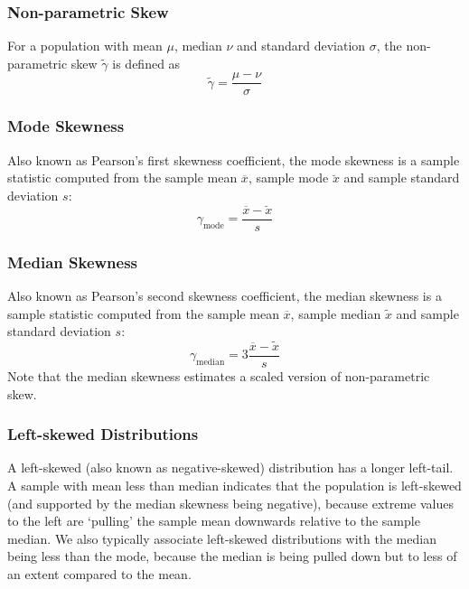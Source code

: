 \documentclass[11pt]{report} %
\begin{document}
\subsubsection{Non-parametric Skew}

For a population with mean $\mu$, median $\nu$ and standard deviation $\sigma$, the non-parametric skew $\widetilde{\gamma}$ is defined as
\begin{equation}
\widetilde{\gamma} = \dfrac{\mu - \nu}{\sigma}
\end{equation}

\subsubsection{Mode Skewness}

Also known as Pearson's first skewness coefficient, the mode skewness is a sample statistic computed from the sample mean $\overline{x}$, sample mode $\breve{x}$ and sample standard deviation $s$:
\begin{equation}
\gamma_{\mathrm{mode}} = \dfrac{\overline{x} - \breve{x}}{s}
\end{equation}

\subsubsection{Median Skewness}

Also known as Pearson's second skewness coefficient, the median skewness is a sample statistic computed from the sample mean $\overline{x}$, sample median $\widetilde{x}$ and sample standard deviation $s$:
\begin{equation}
\gamma_{\mathrm{median}} = 3\dfrac{\overline{x} - \widetilde{x}}{s}
\end{equation}
Note that the median skewness estimates a scaled version of non-parametric skew.

\subsubsection{Left-skewed Distributions}

A left-skewed (also known as negative-skewed) distribution has a longer left-tail. A sample with mean less than median indicates that the population is left-skewed (and supported by the median skewness being negative), because extreme values to the left are `pulling' the sample mean downwards relative to the sample median. We also typically associate left-skewed distributions with the median being less than the mode, because the median is being pulled down but to less of an extent compared to the mean.
\end{document}
